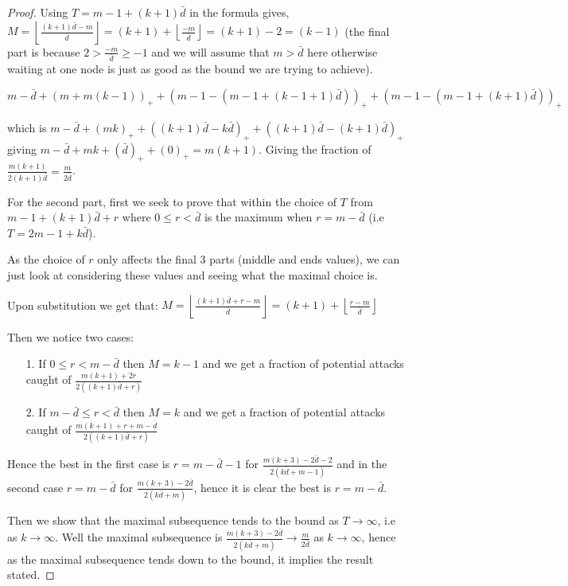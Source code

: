 \documentclass[a4paper,10pt]{article}
\newcommand{\floor}[1]{\left \lfloor #1 \right \rfloor}
\newcommand{\pospart}[1]{\left( #1 \right)_{+}}
\theoremstyle{definition}
\theoremstyle{definition}
\theoremstyle{remark}
\theoremstyle{definition}
\begin{document}
\begin{proof}
Using $T=m-1+(k+1)\bar{d}$ in the formula gives,
$M=\floor{\frac{(k+1) \bar{d}-m}{\bar{d}}}=(k+1)+\floor{\frac{-m}{\bar{d}}}=(k+1)-2=(k-1)$ (the final part is because $2>\frac{-m}{\bar{d}} \geq -1$ and we will assume that $m > \bar{d}$ here otherwise waiting at one node is just as good as the bound we are trying to achieve).

$m-\bar{d}+\pospart{m + m(k-1)} + \pospart{m-1-(m-1+(k-1+1)\bar{d})}+\pospart{m-1-(m-1+(k+1)\bar{d})}$

which is $m-\bar{d}+\pospart{mk} + \pospart{(k+1)\bar{d}-k\bar{d}}+\pospart{(k+1)\bar{d}-(k+1)\bar{d}}$
giving $m-\bar{d}+mk+ \pospart{\bar{d}}+\pospart{0}=m(k+1)$.
Giving the fraction of $\frac{m(k+1)}{2(k+1)\bar{d}}=\frac{m}{2 \bar{d}}$.


For the second part, first we seek to prove that within the choice of $T$ from $m-1+(k+1)\bar{d}+r$ where $0 \leq r < \bar{d}$ is the maximum when $r=m-\bar{d}$ (i.e $T=2m-1+k\bar{d}$).

As the choice of $r$ only affects the final 3 parts (middle and ends values), we can just look at considering these values and seeing what the maximal choice is.

Upon substitution we get that:
$M=\floor{\frac{(k+1)\bar{d}+r-m}{\bar{d}}}=(k+1)+\floor{\frac{r-m}{\bar{d}}}$

Then we notice two cases:

\begin{itemize}
\item[1.] If $0 \leq r < m-\bar{d}$ then $M=k-1$ and we get a fraction of potential attacks caught of $\frac{m(k+1)+2r}{2((k+1)\bar{d}+r)}$

\item[2.] If $m-\bar{d} \leq r < \bar{d}$ then $M=k$ and we get a fraction of potential attacks caught of $\frac{m(k+1)+r+m-\bar{d}}{2((k+1)\bar{d}+r)}$ 
\end{itemize}

Hence the best in the first case is $r=m-\bar{d}-1$ for $\frac{m(k+3)-2\bar{d}-2}{2(k\bar{d}+m-1)}$ and in the second case $r=m-\bar{d}$ for $\frac{m(k+3)-2\bar{d}}{2(k\bar{d}+m)}$, hence it is clear the best is $r=m-\bar{d}$.

Then we show that the maximal subsequence tends to the bound as $T \rightarrow \infty$, i.e as $k \rightarrow \infty$. Well the maximal subsequence is $\frac{m(k+3)-2 \bar{d}}{2(k \bar{d}+m)} \rightarrow \frac{m}{2 \bar{d}}$ as $k \rightarrow \infty$, hence as the maximal subsequence tends down to the bound, it implies the result stated.
\end{proof}
\end{document}
